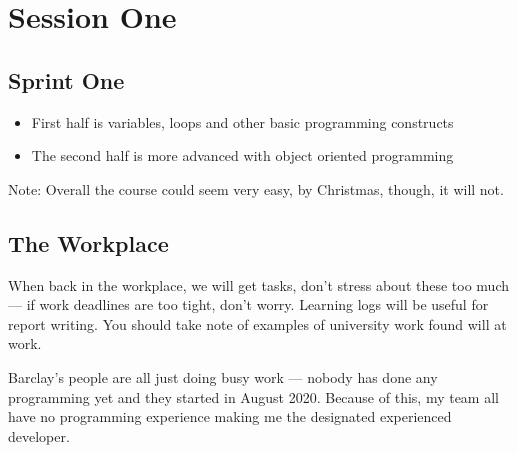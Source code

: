 \section{Session One}\label{sub:session_one}


\subsection{Sprint One}\label{ssub:sprint_one}

\begin{itemize}
    \item First half is variables, loops and other basic programming constructs
    \item The second half is more advanced with object oriented programming
\end{itemize}

\begin{note}
    Note: Overall the course could seem very easy, by Christmas, though, it will not.
\end{note}

\subsection{The Workplace}\label{ssub:the_workplace}

When back in the workplace, we will get tasks, don't stress about these too much --- if work deadlines are too tight, don't worry.
Learning logs will be useful for report writing.
You should take note of examples of university work found will at work.

Barclay's people are all just doing busy work --- nobody has done any programming yet and they started in August 2020. Because of this, my team all have no programming experience making me the designated experienced developer.

